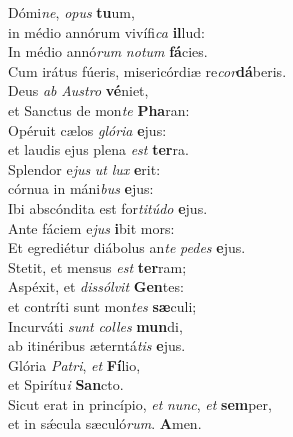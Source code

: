 \evenverse Dómi\textit{ne}, \textit{o}\textit{pus} \textbf{tu}um,~\*\\
\evenverse in médio annórum vivífi\textit{ca} \textbf{il}lud:\\
\oddverse In médio annó\textit{rum} \textit{no}\textit{tum} \textbf{fá}cies.~\*\\
\oddverse Cum irátus fúeris, misericórdiæ re\textit{cor}\textbf{dá}beris.\\
\evenverse Deus \textit{ab} \textit{Au}\textit{stro} \textbf{vé}niet,~\*\\
\evenverse et Sanctus de mon\textit{te} \textbf{Pha}ran:\\
\oddverse Opéruit cælos \textit{gló}\textit{ri}\textit{a} \textbf{e}jus:~\*\\
\oddverse et laudis ejus plena \textit{est} \textbf{ter}ra.\\
\evenverse Splendor e\textit{jus} \textit{ut} \textit{lux} \textbf{e}rit:~\*\\
\evenverse córnua in máni\textit{bus} \textbf{e}jus:\\
\oddverse Ibi abscóndita est for\textit{ti}\textit{tú}\textit{do} \textbf{e}jus.~\*\\
\oddverse Ante fáciem e\textit{jus} \textbf{i}bit mors:\\
\evenverse Et egrediétur diábolus an\textit{te} \textit{pe}\textit{des} \textbf{e}jus.~\*\\
\evenverse Stetit, et mensus \textit{est} \textbf{ter}ram;\\
\oddverse Aspéxit, et \textit{dis}\textit{sól}\textit{vit} \textbf{Gen}tes:~\*\\
\oddverse et contríti sunt mon\textit{tes} \textbf{sæ}culi;\\
\evenverse Incurváti \textit{sunt} \textit{col}\textit{les} \textbf{mun}di,~\*\\
\evenverse ab itinéribus æterntá\textit{tis} \textbf{e}jus.\\
\oddverse Glória \textit{Pa}\textit{tri}, \textit{et} \textbf{Fí}lio,~\*\\
\oddverse et Spirítu\textit{i} \textbf{San}cto.\\
\evenverse Sicut erat in princípio, \textit{et} \textit{nunc}, \textit{et} \textbf{sem}per,~\*\\
\evenverse et in sǽcula sæculó\textit{rum}. \textbf{A}men.\\
